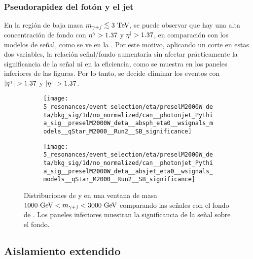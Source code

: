 \subsubsection{Pseudorapidez del fotón y el jet}
\label{subsubsec:evt_selection:sr_opt:eta:etas}

En la región de baja masa \(m_{\gamma+j} \lesssim 3~\text{TeV}\), se puede observar que hay una alta concentración de fondo con \(\eta^{\gamma} > 1.37\) y \(\eta^{\text{j}} > 1.37\), en comparación con los modelos de señal, como se ve en la \Fig{\ref{fig:evt_selection:sr_opt:eta:etas:1d}}. Por este motivo, aplicando un corte en estas dos variables, la relación señal/fondo aumentaría sin afectar prácticamente la significancia de la señal ni en la eficiencia, como se muestra en los paneles inferiores de las figuras. Por lo tanto, se decide eliminar los eventos con \(|\eta^{\gamma}| > 1.37\) y \(|\eta^{\text{j}}| > 1.37\).

\begin{figure}[ht!]
    \centering
    \begin{subfigure}[h]{0.49\linewidth}
        \centering
        \texttt{[image: 5\_resonances/event\_selection/eta/preselM2000W\_deta/bkg\_sig/1d/no\_normalized/can\_\_photonjet\_Pythia\_sig\_\_preselM2000W\_deta\_\_absph\_eta0\_\_wsignals\_models\_\_qStar\_M2000\_\_Run2\_\_SB\_significance]}
        \caption{\etagam}
        \label{fig:evt_selection:sr_opt:eta:etas:1d:ph}
    \end{subfigure}
    \hfill
    \begin{subfigure}[h]{0.49\linewidth}
        \centering
        \texttt{[image: 5\_resonances/event\_selection/eta/preselM2000W\_deta/bkg\_sig/1d/no\_normalized/can\_\_photonjet\_Pythia\_sig\_\_preselM2000W\_deta\_\_absjet\_eta0\_\_wsignals\_models\_\_qStar\_M2000\_\_Run2\_\_SB\_significance]}
        \caption{\etajet}
        \label{fig:evt_selection:sr_opt:eta:etas:1d:jet}
    \end{subfigure}
    \caption{Distribuciones de \etagam y \etajet en una ventana de masa \(1000~\text{GeV} < m_{\gamma+j} < 3000~\text{GeV}\) comparando las señales con el fondo de \yj. Los paneles inferiores muestran la significancia de la señal sobre el fondo.}
    \label{fig:evt_selection:sr_opt:eta:etas:1d}
\end{figure}



\subsection{Aislamiento extendido}
\label{subsec:evt_selection:sr_opt:extended_iso}


